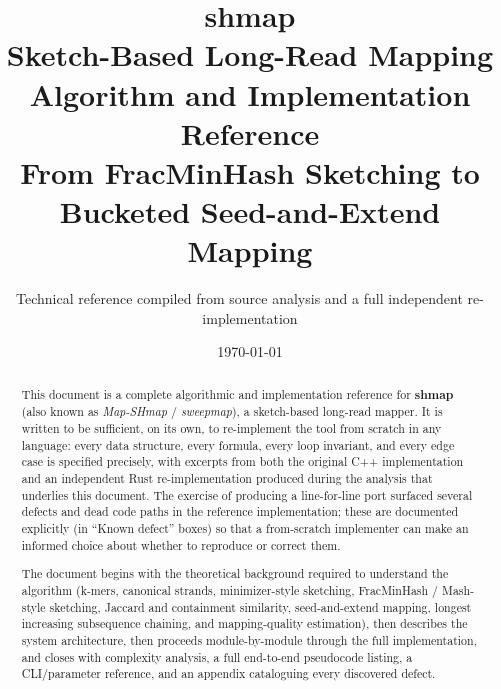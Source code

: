\documentclass[11pt]{report}
\title{
  \Huge\textbf{shmap}\\[0.3cm]
  \Large Sketch-Based Long-Read Mapping\\
  \large Algorithm and Implementation Reference\\[0.5cm]
  \normalsize From FracMinHash Sketching to Bucketed Seed-and-Extend Mapping
}
\author{Technical reference compiled from source analysis and a full independent re-implementation}
\date{\today}
\begin{document}
\maketitle

\begin{abstract}
\noindent
This document is a complete algorithmic and implementation reference for \textbf{shmap} (also
known as \emph{Map-SHmap} / \emph{sweepmap}), a sketch-based long-read mapper. It is written to
be sufficient, on its own, to re-implement the tool from scratch in any language: every data
structure, every formula, every loop invariant, and every edge case is specified precisely, with
excerpts from both the original C++ implementation and an independent Rust re-implementation
produced during the analysis that underlies this document. The exercise of producing a
line-for-line port surfaced several defects and dead code paths in the reference implementation;
these are documented explicitly (in ``Known defect'' boxes) so that a from-scratch implementer can
make an informed choice about whether to reproduce or correct them.

The document begins with the theoretical background required to understand the algorithm
(k-mers, canonical strands, minimizer-style sketching, FracMinHash / Mash-style sketching,
Jaccard and containment similarity, seed-and-extend mapping, longest increasing subsequence
chaining, and mapping-quality estimation), then describes the system architecture, then proceeds
module-by-module through the full implementation, and closes with complexity analysis, a full
end-to-end pseudocode listing, a CLI/parameter reference, and an appendix cataloguing every
discovered defect.
\end{abstract}

\tableofcontents


















\end{document}

